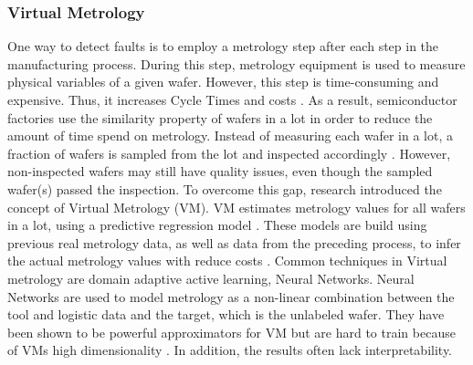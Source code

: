 \documentclass{Academic}
\begin{document}
    \subsubsection{Virtual Metrology}
    One way to detect faults is to employ a metrology step after each step in the manufacturing process. During this step, metrology equipment is used to measure physical variables of a given wafer. However, this step is time-consuming and expensive. Thus, it increases Cycle Times and costs \cite{shim_domain-adaptive_2022}. As a result, semiconductor factories use the similarity property of wafers in a lot in order to reduce the amount of time spend on metrology. Instead of measuring each wafer in a lot, a fraction of wafers is sampled from the lot and inspected accordingly \cite{kim_machine_2012}. However, non-inspected wafers may still have quality issues, even though the sampled wafer(s) passed the inspection. To overcome this gap, research introduced the concept of Virtual Metrology (VM). VM estimates metrology values for all wafers in a lot, using a predictive regression model \cite{kim_machine_2012}. These models are build using previous real metrology data, as well as data from the preceding process, to infer the actual metrology values with reduce costs \cite{shim_domain-adaptive_2022,kim_machine_2012}. Common techniques in Virtual metrology are domain adaptive active learning, Neural Networks. Neural Networks are used to model metrology as a non-linear combination between the tool and logistic data and the target, which is the unlabeled wafer. They have been shown to be powerful approximators for VM but are hard to train because of VMs high dimensionality \cite{susto_automatic_2012}. In addition, the results often lack interpretability. \\
\end{document}
